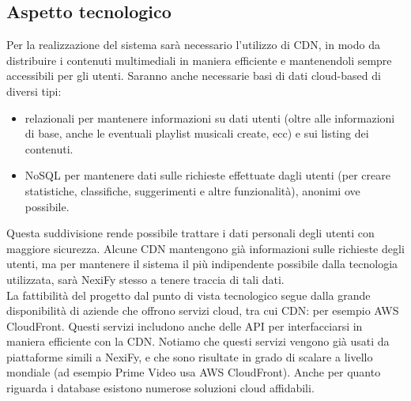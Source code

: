 \subsection{Aspetto tecnologico}
Per la realizzazione del sistema sarà necessario l'utilizzo di CDN, in modo da distribuire i contenuti
multimediali in maniera efficiente e mantenendoli sempre accessibili per gli utenti. Saranno anche necessarie
basi di dati cloud-based di diversi tipi:
\begin{itemize}
	\item relazionali per mantenere informazioni su dati utenti
	(oltre alle informazioni di base, anche le eventuali playlist musicali create, ecc) e sui listing dei contenuti.
	\item NoSQL per mantenere dati sulle richieste effettuate dagli utenti
	(per creare statistiche, classifiche, suggerimenti e altre funzionalità), anonimi ove possibile.
\end{itemize}
Questa suddivisione rende possibile trattare i dati personali degli utenti con maggiore sicurezza.
Alcune CDN mantengono già informazioni sulle richieste degli utenti,
ma per mantenere il sistema il più indipendente possibile dalla tecnologia utilizzata, sarà NexiFy stesso a
tenere traccia di tali dati. \\
La fattibilità del progetto dal punto di vista tecnologico segue dalla grande disponibilità di aziende che offrono servizi cloud, tra cui CDN: per esempio AWS CloudFront. Questi servizi includono anche delle API per interfacciarsi in maniera efficiente con la CDN. Notiamo che questi servizi vengono già usati da piattaforme simili a NexiFy, e che sono risultate in grado di scalare a livello mondiale (ad esempio Prime Video usa AWS CloudFront). Anche per quanto riguarda i database esistono numerose soluzioni cloud affidabili.





